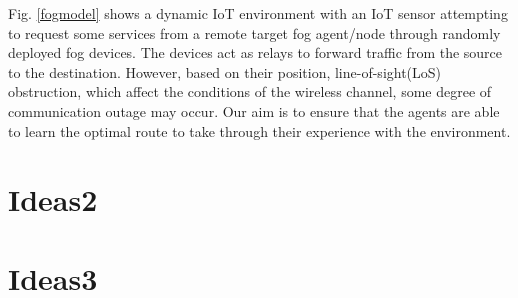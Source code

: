 \documentclass[journal]{IEEEtran}
\begin{document}
Fig. \ref{fogmodel} shows a dynamic IoT environment with an IoT sensor attempting to request some services from a remote target fog agent/node through randomly deployed fog devices. The devices act as relays to forward traffic from the source to the destination. However, based on their position, line-of-sight(LoS) obstruction, which affect the conditions of the wireless channel, some degree of communication outage may occur. Our aim is to ensure that the agents are able to learn the optimal route to take through their experience with the environment.

\section{Ideas2}\label{sec:Ideas2}

\section{Ideas3}\label{sec:Ideas3}









\ifCLASSOPTIONcaptionsoff
  \newpage
\fi



\end{document}
